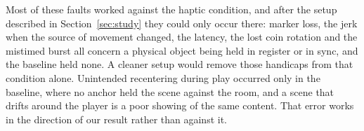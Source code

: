 Most of these faults worked against the haptic condition, and after the setup described in Section~\ref{sec:study} they could only occur there: marker loss, the jerk when the source of movement changed, the latency, the lost coin rotation and the mistimed burst all concern a physical object being held in register or in sync, and the baseline held none. A cleaner setup would remove those handicaps from that condition alone. Unintended recentering during play occurred only in the baseline, where no anchor held the scene against the room, and a scene that drifts around the player is a poor showing of the same content. That error works in the direction of our result rather than against it.
